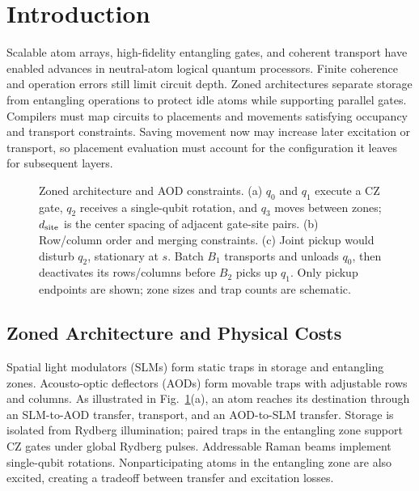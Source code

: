 \section{Introduction}
\label{sec:introduction}

Scalable atom arrays, high-fidelity entangling gates, and coherent transport have enabled advances in neutral-atom logical quantum processors\cite{bluvstein2024logicalprocessor,evered2023highfidelity,bluvstein2022coherenttransport}. Finite coherence and operation errors still limit circuit depth\cite{preskill2018quantum}. Zoned architectures separate storage from entangling operations to protect idle atoms while supporting parallel gates\cite{stade2024abstractmodel,lin2025zac}. Compilers must map circuits to placements and movements satisfying occupancy and transport constraints. Saving movement now may increase later excitation or transport, so placement evaluation must account for the configuration it leaves for subsequent layers.

\begin{figure}[!t]
  \centering
  \resizebox{\textwidth}{!}{}
  \caption{Zoned architecture and AOD constraints. (a) $q_0$ and $q_1$ execute a CZ gate, $q_2$ receives a single-qubit rotation, and $q_3$ moves between zones; $d_{\rm site}$ is the center spacing of adjacent gate-site pairs. (b) Row/column order and merging constraints. (c) Joint pickup would disturb $q_2$, stationary at $s$. Batch $B_1$ transports and unloads $q_0$, then deactivates its rows/columns before $B_2$ picks up $q_1$. Only pickup endpoints are shown; zone sizes and trap counts are schematic.}
  \label{fig:architecture-preliminaries}
\end{figure}

\subsection{Zoned Architecture and Physical Costs}
\label{sec:background}

Spatial light modulators (SLMs) form static traps in storage and entangling zones. Acousto-optic deflectors (AODs) form movable traps with adjustable rows and columns. As illustrated in Fig.~\ref{fig:architecture-preliminaries}(a), an atom reaches its destination through an SLM-to-AOD transfer, transport, and an AOD-to-SLM transfer. Storage is isolated from Rydberg illumination; paired traps in the entangling zone support CZ gates under global Rydberg pulses. Addressable Raman beams implement single-qubit rotations\cite{evered2023highfidelity,lin2025zac}. Nonparticipating atoms in the entangling zone are also excited, creating a tradeoff between transfer and excitation losses.

